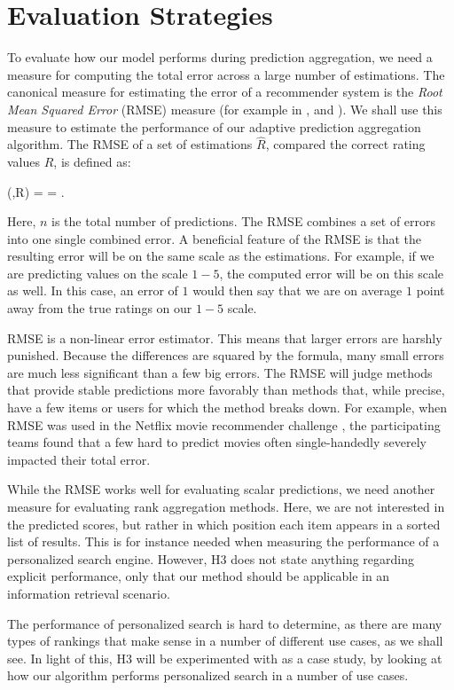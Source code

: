 \section{Evaluation Strategies}

To evaluate how our model performs during prediction aggregation, 
we need a measure for computing the total error across a large number of estimations.
The canonical measure for estimating the error of a recommender system
is the \emph{Root Mean Squared Error} (RMSE) measure
(for example in \citet[p.17]{Herlocker2004}, \citet[p.13]{Adomavicius2005} and \citet[p.6]{Bell2007}).
We shall use this measure to estimate the performance
of our adaptive prediction aggregation algorithm.
The RMSE of a set of estimations $\hat{R}$, 
compared the correct rating values $R$, is defined as:

\begin{eqsp}
  (,R) = 
  = .
\end{eqsp}

Here, $n$ is the total number of predictions.
The RMSE combines a set of errors into one single combined error.
A beneficial feature of the RMSE is that the resulting error 
will be on the same scale as the estimations. For example,
if we are predicting values on the scale $1-5$, the computed error
will be on this scale as well. In this case, an error of $1$
would then say that we are on average $1$ point away from the true 
ratings on our $1-5$ scale.

RMSE is a non-linear error estimator.
This means that larger errors are harshly punished.
Because the differences are squared by the formula,
many small errors are much less significant than a few big errors.
The RMSE will judge methods that provide
stable predictions more favorably
than methods that, while precise, have a few items
or users for which the method breaks down.
For example, when RMSE was used in the Netflix movie recommender challenge
\citep{Linden2009}, the participating teams
found that a few hard to predict movies often 
single-handedly severely impacted their total error.

While the RMSE works well for evaluating scalar predictions,
we need another measure for evaluating rank aggregation methods.
Here, we are not interested in the predicted scores,
but rather in which position each item appears in a sorted list of results.
This is for instance needed when measuring the performance of a
personalized search engine.
However, H3 does not state anything regarding explicit performance,
only that our method should be applicable in an information retrieval scenario.

The performance of personalized search is hard to determine,
as there are many types of rankings that make sense in a number of different use cases,
as we shall see.
In light of this, H3 will be experimented with as a case study,
by looking at how our algorithm performs personalized
search in a number of use cases.

